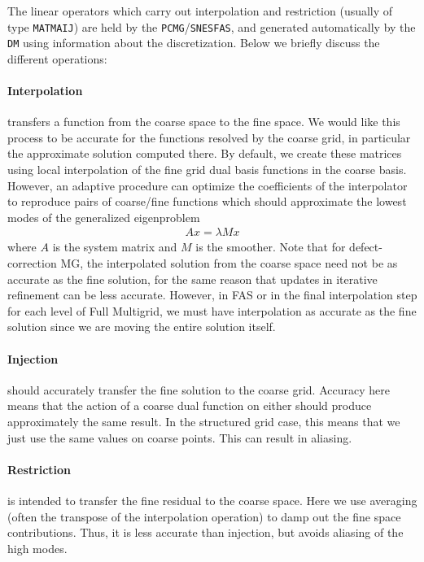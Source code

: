 The linear operators which carry out interpolation and restriction (usually of type \lstinline{MATMAIJ}) are held by
the \lstinline{PCMG}/\lstinline{SNESFAS}, and generated automatically by the \lstinline{DM} using information about the
discretization. Below we briefly discuss the different operations:

\paragraph{Interpolation} transfers a function from the coarse space to the fine space. We would like this process to be
accurate for the functions resolved by the coarse grid, in particular the approximate solution computed there. By
default, we create these matrices using local interpolation of the fine grid dual basis functions in the coarse
basis. However, an adaptive procedure can optimize the coefficients of the interpolator to reproduce pairs of
coarse/fine functions which should approximate the lowest modes of the generalized eigenproblem
\begin{align*}
  A x = \lambda M x
\end{align*}
where $A$ is the system matrix and $M$ is the smoother. Note that for defect-correction MG, the interpolated solution
from the coarse space need not be as accurate as the fine solution, for the same reason that updates in iterative
refinement can be less accurate. However, in FAS or in the final interpolation step for each level of Full Multigrid, we
must have interpolation as accurate as the fine solution since we are moving the entire solution itself.

\paragraph{Injection} should accurately transfer the fine solution to the coarse grid. Accuracy here means that the
action of a coarse dual function on either should produce approximately the same result. In the structured grid case,
this means that we just use the same values on coarse points. This can result in aliasing.

\paragraph{Restriction} is intended to transfer the fine residual to the coarse space. Here we use averaging (often the
transpose of the interpolation operation) to damp out the fine space contributions. Thus, it is less accurate than
injection, but avoids aliasing of the high modes.

